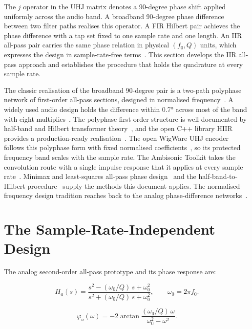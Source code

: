\documentclass[11pt,a4paper]{article}
\begin{document}
The $j$ operator in the UHJ matrix denotes a 90-degree phase shift applied uniformly across the audio band.
A broadband 90-degree phase difference between two filter paths realises this operator.
A FIR Hilbert pair achieves the phase difference with a tap set fixed to one sample rate and one length.
An IIR all-pass pair carries the same phase relation in physical $(f_0, Q)$ units, which expresses the design in sample-rate-free terms~\cite{mastrorillo2023uhj,superstereo_guide}.
This section develops the IIR all-pass approach and establishes the procedure that holds the quadrature at every sample rate.

The classic realisation of the broadband 90-degree pair is a two-path polyphase network of first-order all-pass sections, designed in normalised frequency~\cite{Ansari1987Hilbert,RegaliaMitraVaidyanathan1988,Niemitalo2003}.
A widely used audio design holds the difference within \ang{0.7} across most of the band with eight multiplies~\cite{Niemitalo2003}.
The polyphase first-order structure is well documented by half-band and Hilbert transformer theory~\cite{SchusslerSteffen1998}, and the open C++ library HIIR provides a production-ready realisation~\cite{deSorasHIIR}.
The open WigWare UHJ encoder follows this polyphase form with fixed normalised coefficients~\cite{WigginsWigWare}, so its protected frequency band scales with the sample rate.
The Ambisonic Toolkit takes the convolution route with a single impulse response that it applies at every sample rate~\cite{ATKkernels}.
Minimax and least-squares all-pass phase design~\cite{Lang1998Allpass} and the half-band-to-Hilbert procedure~\cite{HarrisBerdahlAbel2010} supply the methods this document applies.
The normalised-frequency design tradition reaches back to the analog phase-difference networks~\cite{Bedrosian1960}.

\section{The Sample-Rate-Independent Design}

The analog second-order all-pass prototype and its phase response are:

\begin{equation}
H_a(s) = \frac{s^2 - (\omega_0/Q)\,s + \omega_0^2}{s^2 + (\omega_0/Q)\,s + \omega_0^2},
\qquad \omega_0 = 2\pi f_0 .
\end{equation}

\begin{equation}
\varphi_a(\omega) = -2\arctan\!\frac{(\omega_0/Q)\,\omega}{\omega_0^2 - \omega^2} .
\end{equation}
\end{document}
